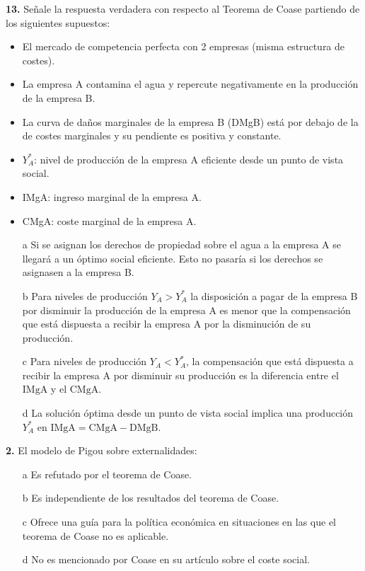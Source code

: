 \documentclass{nuevotema}
\begin{document}
\textbf{13.} Señale la respuesta verdadera con respecto al Teorema de Coase partiendo de los siguientes supuestos:

\begin{itemize}
	\item El mercado de competencia perfecta con 2 empresas (misma estructura de costes).
	\item La empresa A contamina el agua y repercute negativamente en la producción de la empresa B.
	\item La curva de daños marginales de la empresa B (DMgB) está por debajo de la de costes marginales y su pendiente es positiva y constante.
	\item $Y_A^*$: nivel de producción de la empresa A eficiente desde un punto de vista social.
	\item IMgA: ingreso marginal de la empresa A.
	\item CMgA: coste marginal de la empresa A.
\end{itemize}

\begin{itemize}
	\item[a] Si se asignan los derechos de propiedad sobre el agua a la empresa A se llegará a un óptimo social eficiente. Esto no pasaría si los derechos se asignasen a la empresa B.
	\item[b] Para niveles de producción $Y_A > Y_A^*$ la disposición a pagar de la empresa B por disminuir la producción de la empresa A es menor que la compensación que está dispuesta a recibir la empresa A por la disminución de su producción.
	\item[c] Para niveles de producción $Y_A < Y_A^*$, la compensación que está dispuesta a recibir la empresa A por disminuir su producción es la diferencia entre el $\text{IMgA}$ y el $\text{CMgA}$.
	\item[d] La solución óptima desde un punto de vista social implica una producción $Y_A^*$ en $\text{IMgA} = \text{CMgA} - \text{DMgB}$.
\end{itemize}


\textbf{2.} El modelo de Pigou sobre externalidades:
\begin{itemize}
	\item[a] Es refutado por el teorema de Coase.
	\item[b] Es independiente de los resultados del teorema de Coase.
	\item[c] Ofrece una guía para la política económica en situaciones en las que el teorema de Coase no es aplicable.
	\item[d] No es mencionado por Coase en su artículo sobre el coste social.
\end{itemize}
\end{document}

